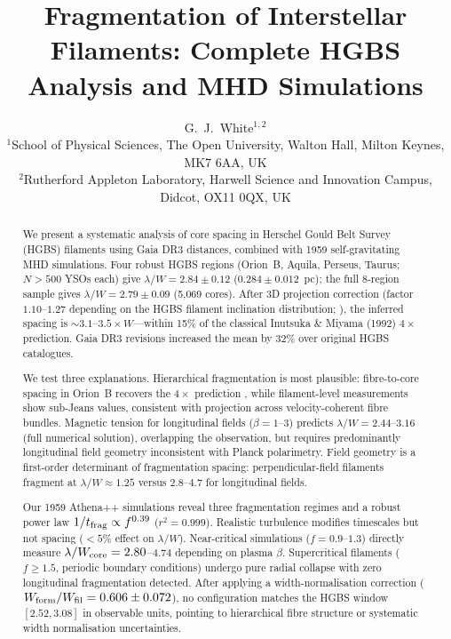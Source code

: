 \documentclass[twoside,twocolumn]{mnras}
\title{Fragmentation of Interstellar Filaments: Complete HGBS Analysis and MHD Simulations}
\author[G.~J.~White]{G.~J.~White$^{1,2}$\\
$^{1}$School of Physical Sciences, The Open University, Walton Hall, Milton Keynes, MK7 6AA, UK\\
$^{2}$Rutherford Appleton Laboratory, Harwell Science and Innovation Campus, Didcot, OX11 0QX, UK}
\begin{document}
\maketitle

\begin{abstract}
We present a systematic analysis of core spacing in Herschel Gould Belt Survey (HGBS)
filaments using Gaia DR3 distances, combined with 1959 self-gravitating MHD simulations.
Four robust HGBS regions (Orion~B, Aquila, Perseus, Taurus; $N>500$ YSOs each) give
$\lambda/W = 2.84 \pm 0.12$ ($0.284 \pm 0.012$~pc); the full 8-region sample gives
$\lambda/W = 2.79 \pm 0.09$ (5,069 cores). After 3D projection correction (factor $1.10$--$1.27$ depending on the HGBS filament inclination distribution; \citealt{Andre2010, Planck2016}),
the inferred spacing is ${\sim}3.1$--$3.5\times W$---within 15\% of the classical
Inutsuka \& Miyama (1992) $4\times$ prediction. Gaia DR3 revisions increased
the mean by 32\% over original HGBS catalogues.

We test three explanations. Hierarchical fragmentation is most plausible: fibre-to-core
spacing in Orion~B recovers the $4\times$ prediction \citep{Yang2024}, while
filament-level measurements show sub-Jeans values, consistent with projection across
velocity-coherent fibre bundles. Magnetic tension for longitudinal fields ($\beta = 1$--$3$)
predicts $\lambda/W = 2.44$--$3.16$ (full numerical solution), overlapping the observation,
but requires predominantly longitudinal field geometry inconsistent with Planck polarimetry.
Field geometry is a first-order determinant of fragmentation spacing: perpendicular-field filaments fragment at
$\lambda/W \approx 1.25$ versus $2.8$--$4.7$ for longitudinal fields.

Our 1959 Athena++ simulations reveal three fragmentation regimes and a robust power law
$1/t_{\rm frag} \propto f^{0.39}$ ($r^2 = 0.999$). Realistic turbulence modifies
timescales but not spacing ($<5\%$ effect on $\lambda/W$). Near-critical simulations
($f = 0.9$--$1.3$) directly measure $\lambda/W_{\rm core} = 2.80$--$4.74$ depending on
plasma $\beta$. Supercritical filaments ($f \geq 1.5$, periodic boundary conditions)
undergo pure radial collapse with zero longitudinal fragmentation detected.
After applying a width-normalisation correction ($W_{\rm form}/W_{\rm fil} = 0.606 \pm 0.072$),
no configuration matches the HGBS window $[2.52, 3.08]$ in observable units, pointing to
hierarchical fibre structure or systematic width normalisation uncertainties.
\end{abstract}
\end{document}
